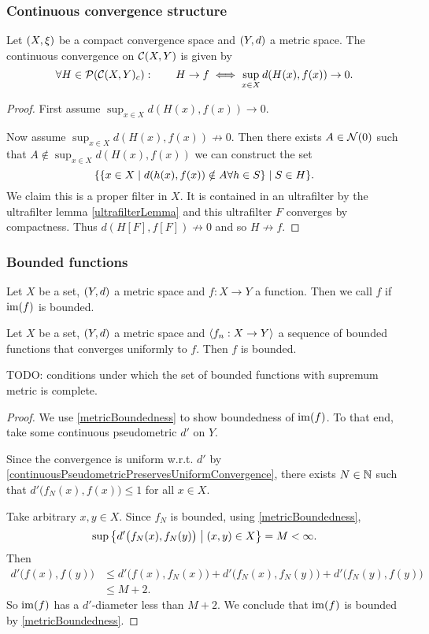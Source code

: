 \subsubsection{Continuous convergence structure}
\begin{proposition}
Let $\sSet{X,\xi}$ be a compact convergence space and $\sSet{Y,d}$ a metric space. The continuous convergence on $\operatorname{\mathcal{C}}(X,Y)$ is given by
\[ \forall H\in\operatorname{\mathcal{P}}(\operatorname{\mathcal{C}}(X,Y)_c): \qquad H\to f \iff \sup_{x\in X}d(H(x), f(x)) \to 0. \]
\end{proposition}
\begin{proof}
First assume $\sup_{x\in X}d(H(x), f(x)) \to 0$. 

Now assume $\sup_{x\in X}d(H(x), f(x)) \not\to 0$. Then there exists $A\in \operatorname{\mathcal{N}}(0)$ such that $A \notin \sup_{x\in X}d(H(x), f(x))$ we can construct the set
\[ \setbuilder{\setbuilder{x\in X}{d(h(x), f(x)) \notin A \forall h\in S}}{S\in H}. \]
We claim this is a proper filter in $X$. It is contained in an ultrafilter by the ultrafilter lemma \ref{ultrafilterLemma} and this ultrafilter $F$ converges by compactness. Thus $d(H[F], f[F]) \not\to 0$ and so $H\not\to f$.
\end{proof}

\subsubsection{Bounded functions}
\begin{definition}
Let $X$ be a set, $\sSet{Y,d}$ a metric space and $f: X\to Y$ a function. Then we call $f$  if $\operatorname{im}(f)$ is bounded.
\end{definition}

\begin{lemma} \label{uniformLimitBoundedFunctionsIsBounded}
Let $X$ be a set, $\sSet{Y,d}$ a metric space and $\left\langle f_n: X\to Y \right\rangle$ a sequence of bounded functions that converges uniformly to $f$. Then $f$ is bounded.
\end{lemma}
TODO: conditions under which the set of bounded functions with supremum metric is complete.
\begin{proof}
We use \ref{metricBoundedness} to show boundedness of $\operatorname{im}(f)$. To that end, take some continuous pseudometric $d'$ on $Y$.

Since the convergence is uniform w.r.t. $d'$ by \ref{continuousPseudometricPreservesUniformConvergence}, there exists $N\in \mathbb{N}$ such that $d'\big(f_N(x), f(x)\big) \leq 1$ for all $x\in X$.

Take arbitrary $x,y\in X$. Since $f_N$ is bounded, using \ref{metricBoundedness},
\[ \sup \setbuilder{d'\big(f_N(x), f_N(y)\big)}{(x,y)\in X} = M < \infty. \]
Then
\begin{align*}
d'\big(f(x), f(y)\big) &\leq d'\big(f(x), f_N(x)\big) + d'\big(f_N(x), f_N(y)\big) + d'\big(f_N(y), f(y)\big) \\
&\leq M+2.
\end{align*}
So $\operatorname{im}(f)$ has a $d'$-diameter less than $M+2$. We conclude that $\operatorname{im}(f)$ is bounded by \ref{metricBoundedness}.
\end{proof}




